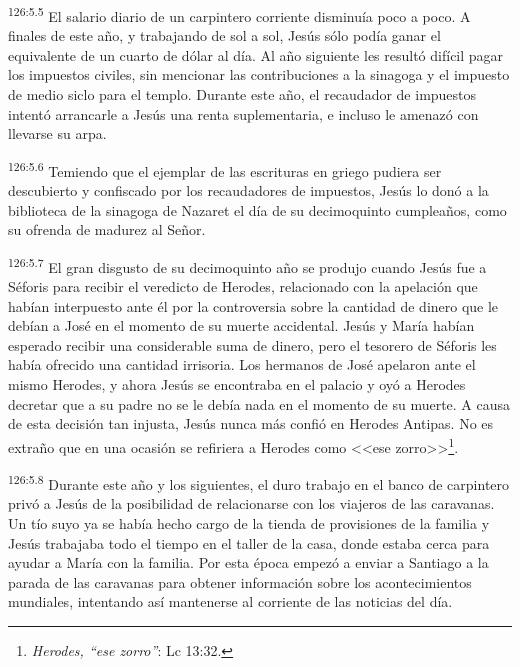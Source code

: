 \par 
\textsuperscript{126:5.5} El salario diario de un carpintero corriente disminuía poco a poco. A finales de este año, y trabajando de sol a sol, Jesús sólo podía ganar el equivalente de un cuarto de dólar al día. Al año siguiente les resultó difícil pagar los impuestos civiles, sin mencionar las contribuciones a la sinagoga y el impuesto de medio siclo para el templo. Durante este año, el recaudador de impuestos intentó arrancarle a Jesús una renta suplementaria, e incluso le amenazó con llevarse su arpa.

\par 
\textsuperscript{126:5.6} Temiendo que el ejemplar de las escrituras en griego pudiera ser descubierto y confiscado por los recaudadores de impuestos, Jesús lo donó a la biblioteca de la sinagoga de Nazaret el día de su decimoquinto cumpleaños, como su ofrenda de madurez al Señor.

\par 
\textsuperscript{126:5.7} El gran disgusto de su decimoquinto año se produjo cuando Jesús fue a Séforis para recibir el veredicto de Herodes, relacionado con la apelación que habían interpuesto ante él por la controversia sobre la cantidad de dinero que le debían a José en el momento de su muerte accidental. Jesús y María habían esperado recibir una considerable suma de dinero, pero el tesorero de Séforis les había ofrecido una cantidad irrisoria. Los hermanos de José apelaron ante el mismo Herodes, y ahora Jesús se encontraba en el palacio y oyó a Herodes decretar que a su padre no se le debía nada en el momento de su muerte. A causa de esta decisión tan injusta, Jesús nunca más confió en Herodes Antipas. No es extraño que en una ocasión se refiriera a Herodes como <<ese zorro>>\footnote{\textit{Herodes, ``ese zorro''}: Lc 13:32.}.

\par 
\textsuperscript{126:5.8} Durante este año y los siguientes, el duro trabajo en el banco de carpintero privó a Jesús de la posibilidad de relacionarse con los viajeros de las caravanas. Un tío suyo ya se había hecho cargo de la tienda de provisiones de la familia y Jesús trabajaba todo el tiempo en el taller de la casa, donde estaba cerca para ayudar a María con la familia. Por esta época empezó a enviar a Santiago a la parada de las caravanas para obtener información sobre los acontecimientos mundiales, intentando así mantenerse al corriente de las noticias del día.

